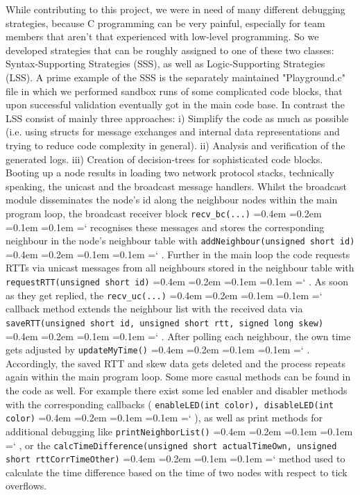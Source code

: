 \documentclass{llncs}
\newcommand{\code}[1]{%
	\texttt{#1}%
	\fontdimen2\font=0.4em
	\fontdimen3\font=0.2em
	\fontdimen4\font=0.1em
	\fontdimen7\font=0.1em
	\hyphenchar\font=`\-
}
\begin{document}
\noindent While contributing to this project, we were in need of many different debugging strategies, because C programming can be very painful, especially for team members that aren't that experienced with low-level programming.
So we developed strategies that can be roughly assigned to one of these two classes: Syntax-Supporting Strategies (SSS), as well as Logic-Supporting Strategies (LSS). 
A prime example of the SSS is the separately maintained "Playground.c" file in which we performed sandbox runs of some complicated code blocks, that upon successful validation eventually got in the main code base.
In contrast the LSS consist of mainly three approaches: i) Simplify the code as much as possible (i.e. using structs for message exchanges and internal data representations and trying to reduce code complexity in general). ii) Analysis and verification of the generated logs. iii) Creation of decision-trees for sophisticated code blocks.\\
Booting up a node results in loading two network protocol stacks, technically speaking, the unicast and the broadcast message handlers. Whilst the broadcast module disseminates the node's id along the neighbour nodes within the main program loop, the broadcast receiver block \code{recv\_bc(...)} recognises these messages and stores the corresponding neighbour in the node's neighbour table with \code{addNeighbour(unsigned short id)}. Further in the main loop the code requests RTTs via unicast messages from all neighbours stored in the neighbour table with \code{requestRTT(unsigned short id)}. As soon as they get replied, the \code{recv\_uc(...)} callback method extends the neighbour list with the received data via \code{saveRTT(unsigned short id, unsigned short rtt, signed long skew)}.
After polling each neighbour, the own time gets adjusted by \code{updateMyTime()}. Accordingly, the saved RTT and skew data gets deleted and the process repeats again within the main program loop.
Some more casual methods can be found in the code as well. For example there exist some led enabler and disabler methods with the corresponding callbacks (\code{enableLED(int color), disableLED(int color)}), as well as print methods for additional debugging like \code{print\-Neighbor\-List()}, or the \code{calcTimeDifference(unsigned short actualTimeOwn, un\-sign\-ed short rttCorrTimeOther)} method used to calculate the time difference based on the time of two nodes with respect to tick overflows.
\end{document}
